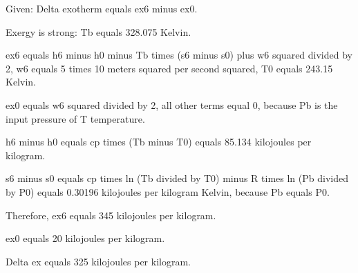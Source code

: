Given: Delta exotherm equals ex6 minus ex0.

Exergy is strong: Tb equals 328.075 Kelvin.

ex6 equals h6 minus h0 minus Tb times (s6 minus s0) plus w6 squared divided by 2, w6 equals 5 times 10 meters squared per second squared, T0 equals 243.15 Kelvin.

ex0 equals w6 squared divided by 2, all other terms equal 0, because Pb is the input pressure of T temperature.

h6 minus h0 equals cp times (Tb minus T0) equals 85.134 kilojoules per kilogram.

s6 minus s0 equals cp times ln (Tb divided by T0) minus R times ln (Pb divided by P0) equals 0.30196 kilojoules per kilogram Kelvin, because Pb equals P0.

Therefore, ex6 equals 345 kilojoules per kilogram.

ex0 equals 20 kilojoules per kilogram.

Delta ex equals 325 kilojoules per kilogram.